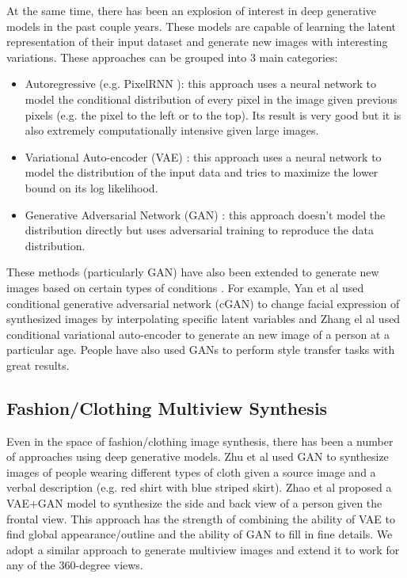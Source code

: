 \documentclass[10pt,conference]{IEEEtran}
\begin{document}
At the same time, there has been an explosion of interest in deep generative models in the past couple years. These models are capable of learning the latent representation of their input dataset and generate new images with interesting variations. These approaches can be grouped into 3 main categories:

\begin{itemize}
\item Autoregressive (e.g. PixelRNN \autocite{oord2016pixel}): this approach uses a neural network to model the conditional distribution of every pixel in the image given previous pixels (e.g. the pixel to the left or to the top). Its result is very good but it is also extremely computationally intensive given large images.

\item Variational Auto-encoder (VAE) \autocite{kingma2013auto}: this approach uses a neural network to model the distribution of the input data and tries to maximize the lower bound on its log likelihood.

\item Generative Adversarial Network (GAN) \autocite{goodfellow2014generative, radford2015unsupervised}: this approach doesn't model the distribution directly but uses adversarial training to reproduce the data distribution.

\end{itemize}

These methods (particularly GAN) have also been extended to generate new images based on certain types of conditions \autocite{mirza2014conditional}. For example, Yan et al \autocite{yan2016attribute2image} used conditional generative adversarial network (cGAN) to change facial expression of synthesized images by interpolating specific latent variables and Zhang el al \autocite{zhang2017age} used conditional variational auto-encoder to generate an new image of a person at a particular age. People have also used GANs \autocite{isola2016image, zhu2017unpaired} to perform style transfer tasks with great results.

\subsection{Fashion/Clothing Multiview Synthesis}

Even in the space of fashion/clothing image synthesis, there has been a number of approaches using deep generative models. Zhu et al \autocite{zhu2017your} used GAN to synthesize images of people wearing different types of cloth given a source image and a verbal description (e.g. red shirt with blue striped skirt). Zhao et al \autocite{zhao2017multi} proposed a VAE+GAN model to synthesize the side and back view of a person given the frontal view. This approach has the strength of combining the ability of VAE to find global appearance/outline and the ability of GAN to fill in fine details. We adopt a similar approach to generate multiview images and extend it to work for any of the 360-degree views.
\end{document}
